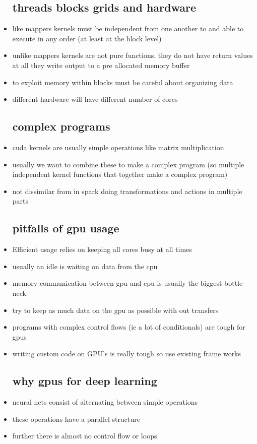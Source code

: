 \documentclass{article}
\begin{document}
\begin{itemize}
\subsection*{threads blocks grids and hardware}
\item like mappers kernels must be independent from one another to and able to execute in any order  (at least at the block level)
\item unlike mappers kernels are not pure functions, they do not have  return values at all they write output to a pre allocated memory buffer
\item to exploit memory within blocks must be careful about organizing data 
\item different hardware will have different number of cores 
\subsection*{complex programs}
\item cuda kernels are usually simple operations like matrix multiplication
\item usually we want to combine these to make a complex program (so multiple independent kernel functions that together make a complex program) 
\item not dissimilar from in spark doing transformations and actions in multiple parts
\subsection*{pitfalls of gpu usage}
\item Efficient usage relies on keeping all cores busy at all times 
\item usually an idle is waiting on data from the cpu 
\item memory communication between gpu and cpu is usually the biggest bottle neck 
\item try to keep as much data on the gpu as possible with out transfers
\item programs with complex control flows (ie a lot of conditionals) are tough for gpus
\item writing custom code on GPU's is really tough so use existing frame works
\subsection*{why gpus for deep learning}
\item neural nets consist of alternating between simple operations
\item these operations have a parallel structure
\item further there is almost no control flow or loops 

\end{itemize}
\end{document}
